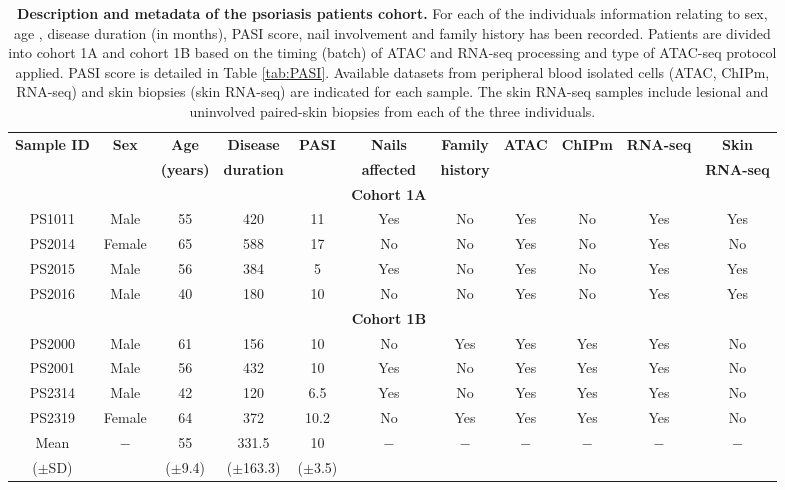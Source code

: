 \begin{landscape}
\renewcommand{\arraystretch}{0.7}
\begin{center}
\begin{longtable}[ht]{c c c c c c c c c c c}
\caption[Description and metadata of the psoriasis patients cohort.]{\textbf{Description and metadata of the psoriasis patients cohort.} For each of the individuals information relating to sex, age , disease duration (in months), PASI score, nail involvement and family history has been recorded. Patients are divided into cohort 1A and cohort 1B based on the timing (batch) of ATAC and RNA-seq processing and type of ATAC-seq protocol applied. PASI score is detailed in Table \ref{tab:PASI}. Available datasets from peripheral blood isolated cells (ATAC, ChIPm, RNA-seq) and skin biopsies (skin RNA-seq) are indicated for each sample. The skin RNA-seq samples include lesional and uninvolved paired-skin biopsies from each of the three individuals.}
\label{tab:Psoriasis_cohort_metadata} \\
\toprule
\textbf{Sample ID} & \textbf{Sex} & \textbf{Age}    & \textbf{Disease}  & \textbf{PASI}  &\textbf{Nails}      & \textbf{Family}  & \textbf{ATAC} & \textbf{ChIPm}& \textbf{RNA-seq} & \textbf{Skin}\\
                    &              & \textbf{(years)} & \textbf{duration} &                & \textbf{affected}  & \textbf{history} & & & & \textbf{RNA-seq} \\
\midrule
\midrule
& & & & & \textbf{Cohort 1A} & & & & & \\
\midrule
PS1011	& Male	 & 55 & 420 & 11	 & Yes	 & No & Yes& No& Yes& Yes\\
PS2014	& Female & 65	& 588	& 17	 & No	   & No & Yes& No& Yes& No\\
PS2015	& Male	 & 56	& 384	& 5	   & Yes   & No & Yes& No& Yes& Yes\\
PS2016	& Male	 & 40	& 180	& 10	 & No    & No & Yes& No& Yes& Yes\\
\midrule
\midrule
 & & & & &\textbf{Cohort 1B} & & & & & \\
\midrule
PS2000	& Male	 & 61	& 156	& 10	 & No	   & Yes & Yes& Yes& Yes& No\\
PS2001	& Male	 & 56	& 432	& 10	 & Yes	 & No  & Yes& Yes& Yes& No\\
PS2314	& Male	 & 42	& 120	& 6.5	 & Yes   & No  & Yes& Yes& Yes& No\\
PS2319	& Female & 64	& 372	& 10.2 & No    & Yes & Yes& Yes& Yes& No\\
\midrule
Mean		  & $-$	 & 55          & 331.5       & 10         & $-$   & $-$ & $-$ & $-$ & $-$ & $-$ \\
($\pm$SD) &      & ($\pm$9.4)  &($\pm$163.3) & ($\pm$3.5) &       &     &     &     &     &  \\																			
\bottomrule
\end{longtable}
\end{center}
\end{landscape}

